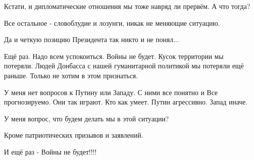 Кстати, и дипломатические отношения мы тоже навряд ли прервём. А что тогда? 

Все остальное - словоблудие и лозунги, никак не меняющие ситуацию. 

Да и четкую позицию Президента так никто и не понял... 

Ещё раз. Надо всем успокоиться. Войны не будет. Кусок территории мы потеряли.
Людей Донбасса с нашей гуманитарной политикой мы потеряли ещё раньше. Только не
хотим в этом признаться. 

У меня нет вопросов к Путину или Западу. С ними все понятно и Все
прогнозируемо. Они так играют. Кто как умеет. Путин агрессивно. Запад иначе. 

У меня вопрос, что будем делать мы в этой ситуации? 

Кроме патриотических призывов и заявлений. 

И ещё раз - Войны не будет!!!!
